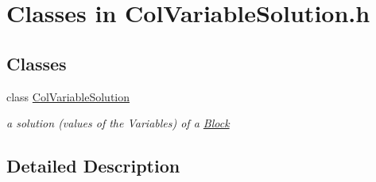 \hypertarget{group___col_variable_solution___c_l_a_s_s_e_s}{}\section{Classes in Col\+Variable\+Solution.\+h}
\label{group___col_variable_solution___c_l_a_s_s_e_s}
\subsection*{Classes}
\begin{DoxyCompactItemize}
\item 
class \mbox{\hyperlink{class_s_m_spp__di__unipi__it_1_1_col_variable_solution}{Col\+Variable\+Solution}}
\begin{DoxyCompactList}\small\item\em a solution (values of the Variables) of a \mbox{\hyperlink{class_s_m_spp__di__unipi__it_1_1_block}{Block}} \end{DoxyCompactList}\end{DoxyCompactItemize}


\subsection{Detailed Description}
